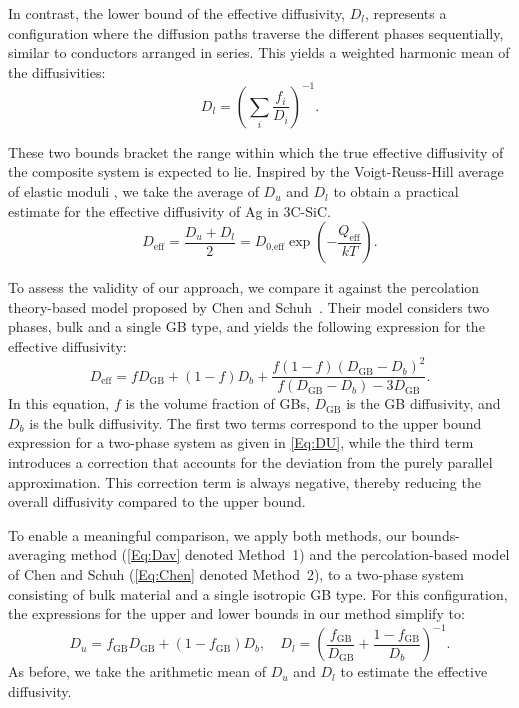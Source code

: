 \documentclass[%
preprint,
amsmath,amssymb,
aps,
]{revtex4-2}
\newcommand{\?}{\stackrel{?}{=}}
\begin{document}
In contrast, the lower bound of the effective diffusivity, $D_l$, represents a configuration where the diffusion paths traverse the different phases sequentially, similar to conductors arranged in series. This yields a weighted harmonic mean of the diffusivities:
\begin{equation}
D_l = \left( \sum_i \frac{f_i}{D_i} \right)^{-1}.
\label{Eq:DL}
\end{equation}

These two bounds bracket the range within which the true effective diffusivity of the composite system is expected to lie. Inspired by the Voigt-Reuss-Hill average of elastic moduli \cite{AbdulHameed2024}, we take the average of $D_u$ and $D_l$ to obtain a practical estimate for the effective diffusivity of Ag in 3C-SiC.
\begin{equation}
D_\text{eff} = \frac{D_u + D_l}{2} = D_\text{0,eff} \exp\left(-\frac{Q_\text{eff}}{kT}\right).
\label{Eq:Dav}
\end{equation}

To assess the validity of our approach, we compare it against the percolation theory-based model proposed by Chen and Schuh~\cite{Chen2007}. Their model considers two phases, bulk and a single GB type, and yields the following expression for the effective diffusivity:
\begin{equation}
D_\text{eff} = f D_\text{GB} + (1-f) D_b + \frac{ f (1-f) ( D_\text{GB} - D_b )^2 }{ f ( D_\text{GB} - D_b ) - 3 D_\text{GB} }.
\label{Eq:Chen}
\end{equation}
In this equation, $f$ is the volume fraction of GBs, $D_\text{GB}$ is the GB diffusivity, and $D_b$ is the bulk diffusivity. The first two terms correspond to the upper bound expression for a two-phase system as given in \cref{Eq:DU}, while the third term introduces a correction that accounts for the deviation from the purely parallel approximation. This correction term is always negative, thereby reducing the overall diffusivity compared to the upper bound.

To enable a meaningful comparison, we apply both methods, our bounds-averaging method (\cref{Eq:Dav} denoted Method~1) and the percolation-based model of Chen and Schuh (\cref{Eq:Chen} denoted Method~2), to a two-phase system consisting of bulk material and a single isotropic GB type. For this configuration, the expressions for the upper and lower bounds in our method simplify to:
\begin{equation}
D_u = f_\text{GB} D_\text{GB} + (1-f_\text{GB}) D_b, \quad D_l = \left( \frac{f_\text{GB}}{D_\text{GB}} + \frac{1-f_\text{GB}}{D_b} \right)^{-1}.
\end{equation}
As before, we take the arithmetic mean of $D_u$ and $D_l$ to estimate the effective diffusivity.
\end{document}
